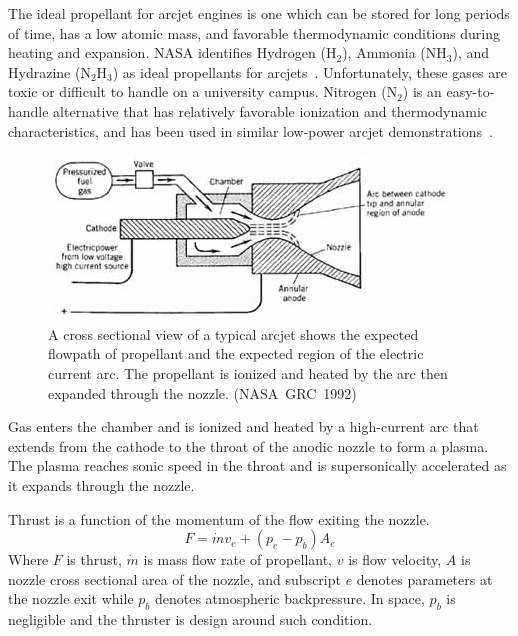 \documentclass[journal]{IEEEtran}
\begin{document}
The ideal propellant for arcjet engines is one which can be stored for long periods of time, has a low atomic mass, and favorable thermodynamic conditions during heating and expansion.
NASA identifies Hydrogen (H$_{2}$), Ammonia (NH$_{3}$), and Hydrazine (N$_{2}$H$_{3}$) as ideal propellants for arcjets~\cite{nasa1992considerations}.
Unfortunately, these gases are toxic or difficult to handle on a university campus.
Nitrogen (N$_{2}$) is an easy-to-handle alternative that has relatively favorable ionization and thermodynamic characteristics, and has been used in similar low-power arcjet demonstrations~\cite{olin2012report,olin2012sim}.
\begin{figure}[htp]
  \centering
  \includegraphics[width=\linewidth]{figs/cross-section_nasa}
  \caption[Arcjet cross-section]{A cross sectional view of a typical arcjet shows the expected flowpath of propellant and the expected region of the electric current arc. The propellant is ionized and heated by the arc then expanded through the nozzle. (NASA~GRC~1992)
\label{fig:x-section-nasa}
}
\end{figure}

Gas enters the chamber and is ionized and heated by a high-current arc that extends from the cathode to the throat of the anodic nozzle to form a plasma.
The plasma reaches sonic speed in the throat and is supersonically accelerated as it expands through the nozzle.

Thrust is a function of the momentum of the flow exiting the nozzle.
\begin{equation}
\label{eq:thrust}
  F=\dot{m}v_e + (p_e-p_b)A_e
\end{equation}
 Where $F$ is thrust, $\dot{m}$ is mass flow rate of propellant, $v$ is flow velocity, $A$ is nozzle cross sectional area of the nozzle, and subscript $e$ denotes parameters at the nozzle exit while $p_b$ denotes atmospheric backpressure.
 In space, $p_b$ is negligible and the thruster is design around such condition.
\end{document}
